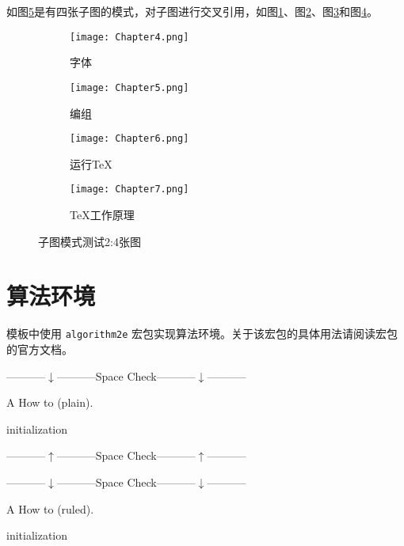 如图\ref{fig:subfig_test2}是有四张子图的模式，对子图进行交叉引用，如图\ref{subfig:2a}、图\ref{subfig:2b}、图\ref{subfig:2c}和图\ref{subfig:2d}。

\begin{figure}[htbp]
	\centering
	\begin{subfigure}[b]{.4\textwidth}
		\centering
		\texttt{[image: Chapter4.png]}
		\caption{字体}\label{subfig:2a}
	\end{subfigure}
	\begin{subfigure}[b]{.4\textwidth}
		\centering
		\texttt{[image: Chapter5.png]}
		\caption{编组}\label{subfig:2b}
	\end{subfigure}
	\begin{subfigure}[b]{.4\textwidth}
		\centering
		\texttt{[image: Chapter6.png]}
		\caption{运行\TeX}\label{subfig:2c}
	\end{subfigure}
	\begin{subfigure}[b]{.4\textwidth}
		\centering
		\texttt{[image: Chapter7.png]}
		\caption{\TeX 工作原理}\label{subfig:2d}
	\end{subfigure}
	\caption{子图模式测试2:4张图}\label{fig:subfig_test2}
\end{figure}

\section{算法环境}

模板中使用 \texttt{algorithm2e} 宏包实现算法环境。关于该宏包的具体用法请阅读宏包的官方文档。\\
\centerline{-----------$\downarrow$-----------Space Check-----------$\downarrow$-----------}
\begin{algorithm}[!h]
	\caption{A How to (plain).}
	
	initialization\;
\end{algorithm}

\centerline{-----------$\uparrow$-----------Space Check-----------$\uparrow$-----------}

\centerline{-----------$\downarrow$-----------Space Check-----------$\downarrow$-----------}
\begin{algorithm}[!h]
	\caption{A How to (ruled).}
	
	initialization\;
\end{algorithm}

